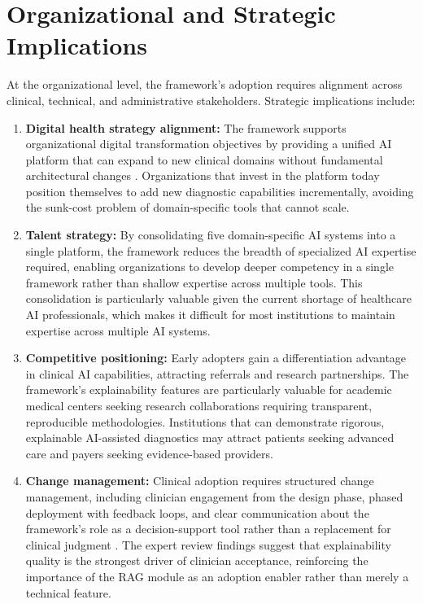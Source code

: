 \section{Organizational and Strategic Implications}
\label{app_j:organizational}

At the organizational level, the framework's adoption requires alignment across clinical, technical, and administrative stakeholders. Strategic implications include:

\begin{enumerate}
    \item \textbf{Digital health strategy alignment:} The framework supports organizational digital transformation objectives by providing a unified AI platform that can expand to new clinical domains without fundamental architectural changes \cite{topol2019deep}. Organizations that invest in the platform today position themselves to add new diagnostic capabilities incrementally, avoiding the sunk-cost problem of domain-specific tools that cannot scale.

    \item \textbf{Talent strategy:} By consolidating five domain-specific AI systems into a single platform, the framework reduces the breadth of specialized AI expertise required, enabling organizations to develop deeper competency in a single framework rather than shallow expertise across multiple tools. This consolidation is particularly valuable given the current shortage of healthcare AI professionals, which makes it difficult for most institutions to maintain expertise across multiple AI systems.

    \item \textbf{Competitive positioning:} Early adopters gain a differentiation advantage in clinical AI capabilities, attracting referrals and research partnerships. The framework's explainability features are particularly valuable for academic medical centers seeking research collaborations requiring transparent, reproducible methodologies. Institutions that can demonstrate rigorous, explainable AI-assisted diagnostics may attract patients seeking advanced care and payers seeking evidence-based providers.

    \item \textbf{Change management:} Clinical adoption requires structured change management, including clinician engagement from the design phase, phased deployment with feedback loops, and clear communication about the framework's role as a decision-support tool rather than a replacement for clinical judgment \cite{kelly2019healthcare}. The expert review findings suggest that explainability quality is the strongest driver of clinician acceptance, reinforcing the importance of the RAG module as an adoption enabler rather than merely a technical feature.


\end{enumerate}
